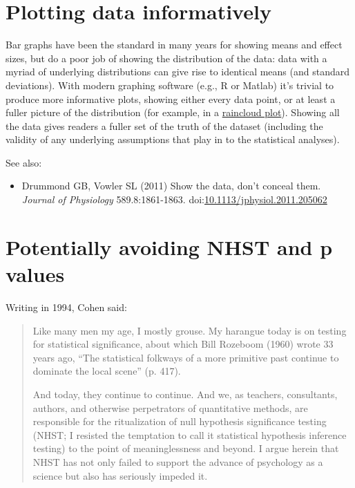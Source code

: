 \documentclass[letterpaper,oneside,11pt,article, portrait]{memoir}
\newcommand{\doi}[1]{doi:\href{http://dx.doi.org/#1}{#1}}
\newcommand{\journal}[1]{\textit{#1}} 			%
\begin{document}
\chapter{Plotting data informatively} \label{plotting}

Bar graphs have been the standard in many years for showing means and effect sizes, but do a poor job of showing the distribution of the data: data with a myriad of underlying distributions can give rise to identical means (and standard deviations). With modern graphing software (e.g., R or Matlab) it's trivial to produce more informative plots, showing either every data point, or at least a fuller picture of the distribution (for example, in a \href{https://peerj.com/preprints/27137v1/}{raincloud plot}). Showing all the data gives readers a fuller set of the truth of the dataset (including the validity of any underlying assumptions that play in to the statistical analyses).


\vspace{1em} \noindent See also:

\begin{itemize}

\item Drummond GB, Vowler SL (2011) Show the data, don't conceal them. \journal{Journal of Physiology} 589.8:1861-1863. \doi{10.1113/jphysiol.2011.205062}

\end{itemize}


\chapter{Potentially avoiding NHST and p values} \label{avoidNHST}

Writing in 1994, Cohen said:

\begin{quote}
Like many men my age, I mostly grouse. My harangue today is on testing for statistical significance, about which Bill Rozeboom (1960) wrote 33 years ago, ``The statistical folkways of a more primitive past continue to dominate the local scene'' (p. 417).

And today, they continue to continue. And we, as teachers, consultants, authors, and otherwise perpetrators of quantitative methods, are responsible for the ritualization of null hypothesis significance testing (NHST; I resisted the temptation to call it statistical hypothesis inference testing) to the point of meaninglessness and beyond. I argue herein that NHST has not only failed to support the advance of psychology as a science but also has seriously impeded it.
\end{quote}
\end{document}
